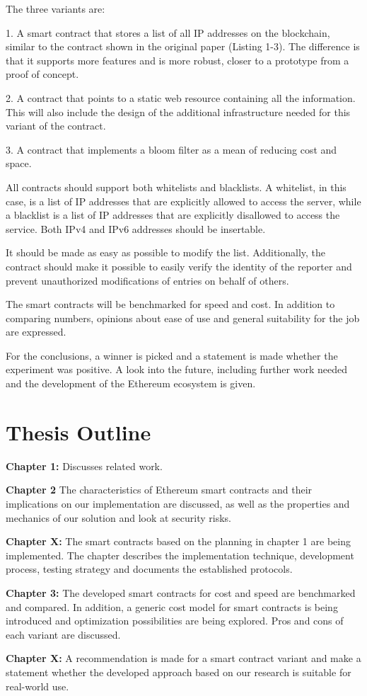 The three variants are:

1. A smart contract that stores a list of all IP addresses on the blockchain, similar to the contract shown in the original paper \cite{OriginalPaper} (Listing 1-3). The difference is that it supports more features and is more robust, closer to a prototype from a proof of concept.

2. A contract that points to a static web resource containing all the information. This will also include the design of the additional infrastructure needed for this variant of the contract.

3. A contract that implements a bloom filter as a mean of reducing cost and space.

All contracts should support both whitelists and blacklists.
A whitelist, in this case, is a list of IP addresses that are explicitly allowed to access the server, while a blacklist is a list of IP addresses that are explicitly disallowed to access the service.
Both IPv4 and IPv6 addresses should be insertable.

It should be made as easy as possible to modify the list. Additionally, the contract should make it possible to easily verify the identity of the reporter and prevent unauthorized modifications of entries on behalf of others.

The smart contracts will be benchmarked for speed and cost. In addition to comparing numbers, opinions about ease of use and general suitability for the job are expressed.

For the conclusions, a winner is picked and a statement is made whether the experiment was positive. A look into the future, including further work needed and the development of the Ethereum ecosystem is given.

\section{Thesis Outline}

\textbf{Chapter 1:} Discusses related work. 

\textbf{Chapter 2} The characteristics of Ethereum smart contracts and their implications on our implementation are discussed, as well as the properties and mechanics of our solution and look at security risks.

\textbf{Chapter X:} The smart contracts based on the planning in chapter 1 are being implemented. The chapter describes the implementation technique, development process, testing strategy and documents the established protocols.

\textbf{Chapter 3:} The developed smart contracts for cost and speed are benchmarked and compared. In addition, a generic cost model for smart contracts is being introduced and optimization possibilities are being explored. Pros and cons of each variant are discussed.

\textbf{Chapter X:} A recommendation is made for a smart contract variant and make a statement whether the developed approach based on our research is suitable for real-world use.
